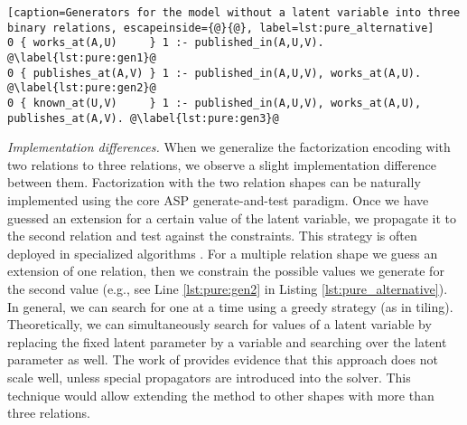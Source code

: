 \begin{lstlisting}[caption=Generators for the model without a latent variable into three binary relations, escapeinside={@}{@}, label=lst:pure_alternative] 
0 { works_at(A,U)     } 1 :- published_in(A,U,V). @\label{lst:pure:gen1}@
0 { publishes_at(A,V) } 1 :- published_in(A,U,V), works_at(A,U). @\label{lst:pure:gen2}@
0 { known_at(U,V)     } 1 :- published_in(A,U,V), works_at(A,U), publishes_at(A,V). @\label{lst:pure:gen3}@
\end{lstlisting}


\textit{Implementation differences.} When we generalize the factorization encoding with two relations to three relations, we observe a slight implementation difference between them. Factorization with the two relation shapes can be naturally implemented using the core ASP generate-and-test paradigm. Once we have guessed an extension for a certain value of the latent variable, we propagate it to the second relation and test against the constraints. This strategy is often deployed in specialized algorithms \parencite{tiling, dbp}.
For a multiple relation shape we guess an extension of one relation, then we constrain the possible values we generate for the second value (e.g., see Line \ref{lst:pure:gen2} in Listing \ref{lst:pure_alternative}). In general, we can search for one at a time using a greedy strategy (as in tiling). Theoretically, we can simultaneously search for values of a latent variable by replacing the fixed latent parameter by a variable and searching over the latent parameter as well. The work of \cite{tias_topk} provides evidence that this approach does not scale well, unless special propagators are introduced into the solver. This technique would allow extending the method to other shapes with more than three relations.
